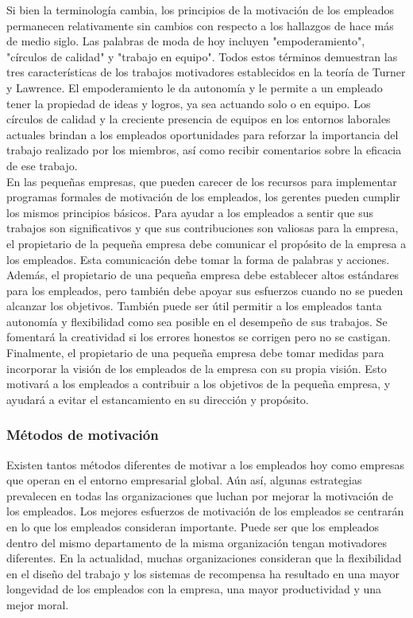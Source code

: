 \documentclass[10pt]{book}
\begin{document}
Si bien la terminología cambia, los principios de la motivación de los empleados permanecen relativamente sin cambios con respecto a los hallazgos de hace más de medio siglo. Las palabras de moda de hoy incluyen "empoderamiento", "círculos de calidad" y "trabajo en equipo". Todos estos términos demuestran las tres características de los trabajos motivadores establecidos en la teoría de Turner y Lawrence. El empoderamiento le da autonomía y le permite a un empleado tener la propiedad de ideas y logros, ya sea actuando solo o en equipo. Los círculos de calidad y la creciente presencia de equipos en los entornos laborales actuales brindan a los empleados oportunidades para reforzar la importancia del trabajo realizado por los miembros, así como recibir comentarios sobre la eficacia de ese trabajo.\\
En las pequeñas empresas, que pueden carecer de los recursos para implementar programas formales de motivación de los empleados, los gerentes pueden cumplir los mismos principios básicos. Para ayudar a los empleados a sentir que sus trabajos son significativos y que sus contribuciones son valiosas para la empresa, el propietario de la pequeña empresa debe comunicar el propósito de la empresa a los empleados. Esta comunicación debe tomar la forma de palabras y acciones. Además, el propietario de una pequeña empresa debe establecer altos estándares para los empleados, pero también debe apoyar sus esfuerzos cuando no se pueden alcanzar los objetivos. También puede ser útil permitir a los empleados tanta autonomía y flexibilidad como sea posible en el desempeño de sus trabajos. Se fomentará la creatividad si los errores honestos se corrigen pero no se castigan. Finalmente, el propietario de una pequeña empresa debe tomar medidas para incorporar la visión de los empleados de la empresa con su propia visión. Esto motivará a los empleados a contribuir a los objetivos de la pequeña empresa, y ayudará a evitar el estancamiento en su dirección y propósito.
\subsubsection{Métodos de motivación}
Existen tantos métodos diferentes de motivar a los empleados hoy como empresas que operan en el entorno empresarial global. Aún así, algunas estrategias prevalecen en todas las organizaciones que luchan por mejorar la motivación de los empleados. Los mejores esfuerzos de motivación de los empleados se centrarán en lo que los empleados consideran importante. Puede ser que los empleados dentro del mismo departamento de la misma organización tengan motivadores diferentes. En la actualidad, muchas organizaciones consideran que la flexibilidad en el diseño del trabajo y los sistemas de recompensa ha resultado en una mayor longevidad de los empleados con la empresa, una mayor productividad y una mejor moral.\\
\end{document}
